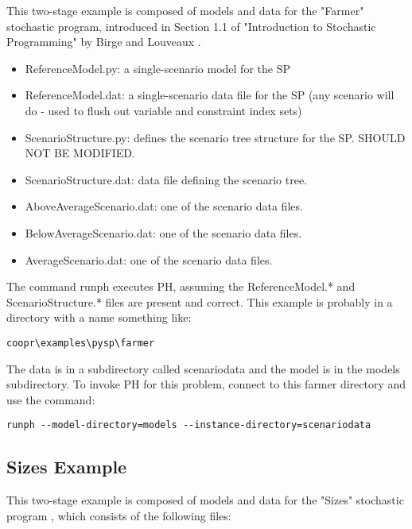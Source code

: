 This two-stage example is composed of models and data for the "Farmer" stochastic program, introduced in Section 1.1 of 
"Introduction to Stochastic Programming" by Birge and 
Louveaux \cite{spbook}. 

\begin{itemize}
\item ReferenceModel.py: a single-scenario model for the SP
\item ReferenceModel.dat: a single-scenario data file for the SP (any scenario will do - used to flush out variable and constraint index sets)
\item ScenarioStructure.py: defines the scenario tree structure for the SP. SHOULD NOT BE MODIFIED.
\item ScenarioStructure.dat: data file defining the scenario tree.
\item AboveAverageScenario.dat: one of the scenario data files.
\item BelowAverageScenario.dat: one of the scenario data files.
\item AverageScenario.dat: one of the scenario data files.
\end{itemize}

The command runph executes PH, assuming the ReferenceModel.* and ScenarioStructure.* files are present and correct. 
This example is probably in a directory with a name something like:

\begin{verbatim}
coopr\examples\pysp\farmer
\end{verbatim}

The data is in a subdirectory called scenariodata and the model is in the models subdirectory. To
invoke PH for this problem, connect to this farmer directory and use the command:

\begin{verbatim}
runph --model-directory=models --instance-directory=scenariodata
\end{verbatim}

\subsection{Sizes Example}

This two-stage example is composed of models and data for the "Sizes" stochastic program \cite{sizes,lokwood}, which consists of the following files:

